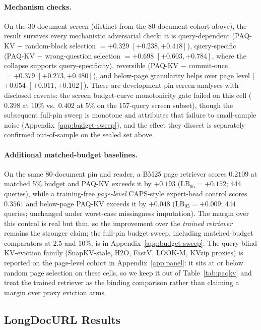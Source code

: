 \documentclass[letterpaper]{article} %
\newcommand{\paqc}{\textsc{PAQ-KV}}
\newcommand{\lb}{\mathrm{LB}_{95}}
\begin{document}
\paragraph{Mechanism checks.} On the 30-document screen (distinct from the 80-document cohort above), the result survives every mechanistic adversarial check: it is query-dependent (\paqc{} $-$ random-block selection $= +0.329$ $[+0.238,+0.418]$), query-specific (\paqc{} $-$ wrong-question selection $= +0.698$ $[+0.603,+0.784]$, where the collapse supports query-specificity), reversible (\paqc{} $-$ commit-once $= +0.379$ $[+0.273,+0.480]$), and below-page granularity helps over page level ($+0.054$ $[+0.011,+0.102]$). These are development-pin screen analyses with disclosed caveats: the screen budget-curve monotonicity gate failed on this cell ($0.398$ at 10\% vs.\ $0.402$ at 5\% on the 157-query screen subset), though the subsequent full-pin sweep is monotone and attributes that failure to small-sample noise (Appendix~\ref{app:budget-sweep}), and the effect they dissect is separately confirmed out-of-sample on the sealed set above.

\paragraph{Additional matched-budget baselines.} On the same 80-document pin and reader, a BM25 page retriever scores $0.2109$ at matched 5\% budget and \paqc{} exceeds it by $+0.193$ ($\lb=+0.152$; 444 queries), while a training-free \emph{page-level} CAPS-style expert-head control scores $0.3561$ and below-page \paqc{} exceeds it by $+0.048$ ($\lb=+0.009$; 444 queries; unchanged under worst-case missingness imputation). The margin over this control is real but thin, so the improvement over the \emph{trained retriever} remains the stronger claim; the full-pin budget sweep, including matched-budget comparators at $2.5$ and $10\%$, is in Appendix~\ref{app:budget-sweep}. The query-blind KV-eviction family (SnapKV-stale, H2O, FastV, LOOK-M, KVzip proxies) is reported on the page-level cohort in Appendix~\ref{app:panel}: it sits at or below random page selection on these cells, so we keep it out of Table~\ref{tab:paqkv} and treat the trained retriever as the binding comparison rather than claiming a margin over proxy eviction arms.

\subsection{LongDocURL Results}\label{sec:results-longdocurl}
\end{document}
